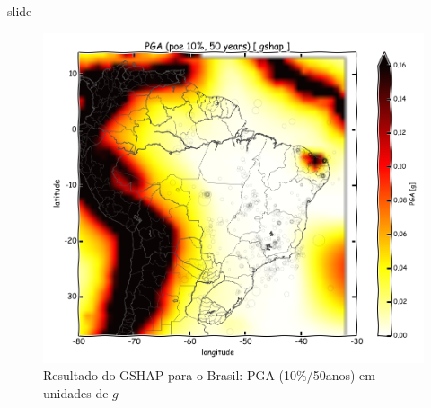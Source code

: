 \documentclass[ucs,8pt]{beamer}
\begin{document}
\begin{frame}{slide}

\begin{figure}[H]
  \centering
  \includegraphics[height=.80\textheight]{pga_gshap} 
  \caption{Resultado do GSHAP para o Brasil: \gls{PGA} (10\%/50anos) em unidades de $g$}
  \label{fig:gshap} 
\end{figure}

\end{frame}
\end{document}
